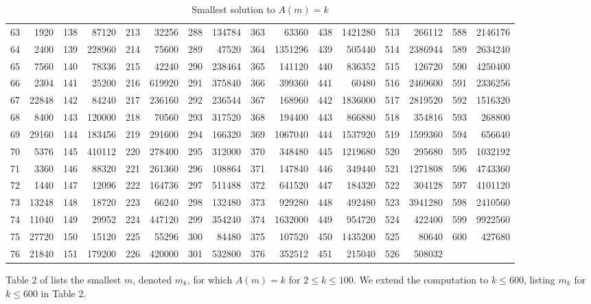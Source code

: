 \documentclass[11pt]{amsart}
\theoremstyle{remark}
\theoremstyle{plain}
\numberwithin{equation}{section}
\renewcommand{\(}{\left(}
\renewcommand{\)}{\right)}
\renewcommand{\le}{\leqslant}
\begin{document}
{\begin{table}
\begin{tabular}{|lr|lr|lr|lr|lr|lr|lr|lr|}
   63 & 1920 &  138 & 87120 &  213 & 32256 &  288 & 134784 &  363 & 63360 &  438 & 1421280 &  513 & 266112 &  588 & 2146176 \\
   64 & 2400 &  139 & 228960 &  214 & 75600 &  289 & 47520 &  364 & 1351296 &  439 & 505440 &  514 & 2386944 &  589 & 2634240\\
   65 & 7560 &  140 & 78336 &  215 & 42240 &  290 & 238464 &  365 & 141120 &  440 & 836352 &  515 & 126720 &  590 & 4250400 \\
   66 & 2304 &  141 & 25200 &  216 & 619920 &  291 & 375840 &  366 & 399360 &  441 & 60480 &  516 & 2469600 &  591 & 2336256 \\
   67 & 22848 &  142 & 84240 &  217 & 236160 &  292 & 236544 &  367 & 168960 &  442 & 1836000 &  517 & 2819520 &  592 & 1516320 \\
   68 & 8400 &  143 & 120000 &  218 & 70560 &  293 & 317520 &  368 & 194400 &  443 & 866880 &  518 & 354816 &  593 & 268800 \\
   69 & 29160 &  144 & 183456 &  219 & 291600 &  294 & 166320 &  369 & 1067040 &  444 & 1537920 &  519 & 1599360 &  594 & 656640 \\
   70 & 5376 &  145 & 410112 &  220 & 278400 &  295 & 312000 &  370 & 348480 &  445 & 1219680 &  520 & 295680 &  595 & 1032192 \\
   71 & 3360 &  146 & 88320 &  221 & 261360 &  296 & 108864 &  371 & 147840 &  446 & 349440 &  521 & 1271808 &  596 & 4743360 \\
   72 & 1440 &  147 & 12096 &  222 & 164736 &  297 & 511488 &  372 & 641520 &  447 & 184320 &  522 & 304128 &  597 & 4101120 \\
   73 & 13248 &  148 & 18720 &  223 & 66240 &  298 & 132480 &  373 & 929280 &  448 & 492480 &  523 & 3941280 &  598 & 2410560 \\
   74 & 11040 &  149 & 29952 &  224 & 447120 &  299 & 354240 &  374 & 1632000 &  449 & 954720 &  524 & 422400 &  599 & 9922560 \\
   75 & 27720 &  150 & 15120 &  225 & 55296 &  300 & 84480 &  375 & 107520 &  450 & 1435200 &  525 & 80640 &  600 & 427680 \\
   76 & 21840 &  151 & 179200 &  226 & 420000 &  301 & 532800 &  376 & 352512 &  451 & 215040 &  526 & 508032 & & \\
\hline
\end{tabular}
\caption{Smallest solution to $A(m)=k$}
\end{table}
}  %


Table 2 of \cite{SW} lists
the smallest $m$, denoted $m_k$, for which $A(m)=k$ for $2\le k\le 100$.  We extend the
computation to $k\le 600$, listing $m_k$ for $k\le 600$ in Table 2.
\end{document}
